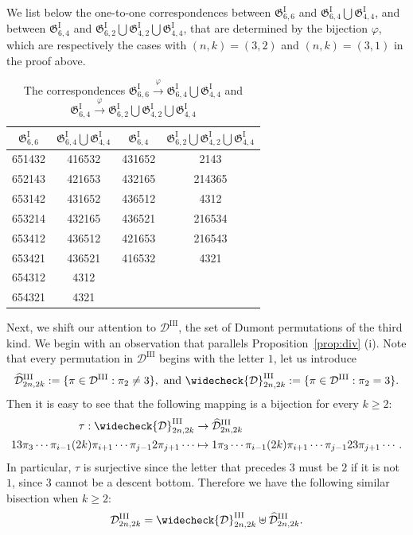 \documentclass[11pt,reqno]{amsart}
\numberwithin{equation}{section}
\theoremstyle{plain}
\theoremstyle{definition}
\newcommand{\D}{\mathcal{D}}
\newcommand{\fG}{\mathfrak{G}}
\newcommand{\GI}{\fG^{\mathrm{I}}}
\newcommand{\DIII}{\D^{\mathrm{III}}}
\newcommand{\tD}{\widehat{\D}^{\mathrm{III}}}
\newcommand{\cD}{\widecheck{\D}^{\mathrm{III}}}
\begin{document}
We list below the one-to-one correspondences between $\GI_{6,6}$ and $\GI_{6,4}\bigcup\GI_{4,4}$, and between $\GI_{6,4}$ and $\GI_{6,2}\bigcup\GI_{4,2}\bigcup\GI_{4,4}$, that are determined by the bijection $\varphi$, which are respectively the cases with $(n,k)=(3,2)$ and $(n,k)=(3,1)$ in the proof above.
	\begin{table}[H]
		\renewcommand{\arraystretch}{1.4}
		\centering
		\begin{tabular}{c|c||c|c}
			$\GI_{6,6}$ & $\GI_{6,4}\bigcup \GI_{4,4}$ & $\GI_{6,4}$ & $\GI_{6,2}\bigcup\GI_{4,2}\bigcup\GI_{4,4}$\\ \hline
			651432 & 416532 & 431652 & 2143 \\
			652143 & 421653 & 432165 & 214365 \\
			653142 & 431652 & 436512 & 4312 \\
			653214 & 432165 & 436521 & 216534 \\
			653412 & 436512 & 421653 & 216543 \\ 
			653421 & 436521 & 416532 & 4321 \\ 
			654312 & 4312 & & \\
			654321 & 4321 & & \\
		\end{tabular}
		\caption{The correspondences $\GI_{6,6}\xrightarrow{\varphi}\GI_{6,4}\bigcup \GI_{4,4}$ and $\GI_{6,4}\xrightarrow{\varphi}\GI_{6,2}\bigcup\GI_{4,2}\bigcup\GI_{4,4}$}
	\end{table}

Next, we shift our attention to $\DIII$, the set of Dumont permutations of the third kind. We begin with an observation that parallels Proposition~\ref{prop:div} (i). Note that every permutation in $\DIII$ begins with the letter $1$, let us introduce
$$\tD_{2n,2k}:=\{\pi\in\DIII:\pi_2\neq 3\}, \text{ and } \cD_{2n,2k}:=\{\pi\in\DIII:\pi_2= 3\}.$$
Then it is easy to see that the following mapping is a bijection for every $k\ge 2$:
\begin{align*}
\tau:  \cD_{2n,2k} &\to \tD_{2n,2k} \\
13 \pi_3 \cdots \pi_{i-1}(2k)\pi_{i+1} \cdots \pi_{j-1} 2\pi_{j+1} \cdots &\mapsto 1\pi_3 \cdots \pi_{i-1}(2k)\pi_{i+1} \cdots \pi_{j-1} 23 \pi_{j+1} \cdots.
\end{align*}
In particular, $\tau$ is surjective since the letter that precedes $3$ must be $2$ if it is not $1$, since $3$ cannot be a descent bottom. Therefore we have the following similar bisection when $k\ge 2$:
\begin{align}\label{DIII-bisec}
\DIII_{2n,2k}=\cD_{2n,2k}\uplus\tD_{2n,2k}.
\end{align}
\end{document}
